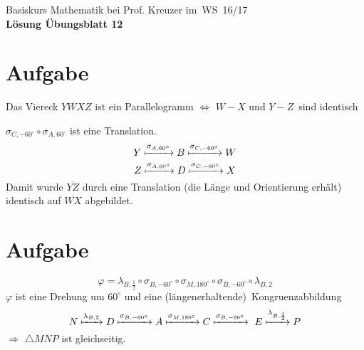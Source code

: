 \documentclass[a4paper,10pt]{article}
\begin{document}
\begin{center}
	\huge Basiskurs Mathematik bei Prof. Kreuzer im WS 16/17 \\
	\Huge \textbf{Lösung Übungsblatt 12} \\
	\normalsize
\end{center}

\section{Aufgabe}
Das Viereck $YWXZ$ ist ein Parallelogramm $\Leftrightarrow$ $W-X$ und $Y-Z$ sind identisch

$\sigma_{C,-60^\circ} \circ \sigma_{A,60^\circ}$ ist eine Translation.\\
\[Y \xmapsto{\sigma_{A,60^\circ}} B \xmapsto{\sigma_{C,-60^\circ}} W\]
\[Z \xmapsto{\sigma_{A,60^\circ}} D \xmapsto{\sigma_{C,-60^\circ}} X\]
Damit wurde $\overline{YZ}$ durch eine Translation (die Länge und Orientierung erhält) identisch auf $\overline{WX}$ abgebildet.


\section{Aufgabe}
\[\varphi = \lambda_{B, \frac{1}{2}} \circ \sigma_{B,-60^\circ} \circ \sigma_{M,180^\circ} \circ \sigma_{B,-60^\circ} \circ \lambda_{B,2}\]
$\varphi$ ist eine Drehung um $60^\circ$ und eine (längenerhaltende) Kongruenzabbildung
\[N\xmapsto{\lambda_{B,2}} D \xmapsto{\sigma_{B,-60^\circ}} A \xmapsto{\sigma_{M,180^\circ}} C \xmapsto{\sigma_{B,-60^\circ}} E \xmapsto{\lambda_{B, \frac{1}{2}}} P\]
$\Rightarrow$ $\triangle MNP$ ist gleichseitig.
\end{document}
